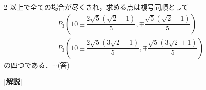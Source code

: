 \documentclass[../../main.tex]{subfiles}
\begin{document}
\begin{multicols}{2}
  以上で全ての場合が尽くされ，求める点は複号同順として
  \begin{align}
    & P_3\left(10\pm\dfrac{2\sqrt{5}(\sqrt{2}-1)}{5}, \mp\dfrac{\sqrt{5}(\sqrt{2}-1)}{5}\right)   \\
    & P_3\left(10\pm\dfrac{2\sqrt{5}(3\sqrt{2}+1)}{5}, \mp\dfrac{\sqrt{5}(3\sqrt{2}+1)}{5}\right)
  \end{align}
  の四つである．$\cdots$(答)

  {\bf [解説]}

  \newpage
\end{multicols}
\end{document}
